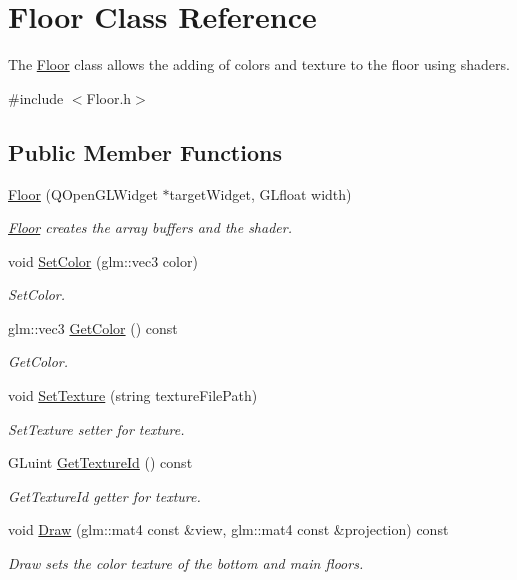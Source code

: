 \hypertarget{class_floor}{}\section{Floor Class Reference}
\label{class_floor}


The \hyperlink{class_floor}{Floor} class allows the adding of colors and texture to the floor using shaders.  




{\ttfamily \#include $<$Floor.\+h$>$}

\subsection*{Public Member Functions}
\begin{DoxyCompactItemize}
\item 
\hyperlink{class_floor_acd7d3bf0e838d5de06e973ac6310511b}{Floor} (Q\+Open\+G\+L\+Widget $\ast$target\+Widget, G\+Lfloat width)
\begin{DoxyCompactList}\small\item\em \hyperlink{class_floor}{Floor} creates the array buffers and the shader. \end{DoxyCompactList}\item 
void \hyperlink{class_floor_a6d0e6150ba611e218d81af542c8e0196}{Set\+Color} (glm\+::vec3 color)
\begin{DoxyCompactList}\small\item\em Set\+Color. \end{DoxyCompactList}\item 
glm\+::vec3 \hyperlink{class_floor_ad6022b618376adbf7087d5ccd3ea053d}{Get\+Color} () const 
\begin{DoxyCompactList}\small\item\em Get\+Color. \end{DoxyCompactList}\item 
void \hyperlink{class_floor_a61a025433294398423351ecc560e467b}{Set\+Texture} (string texture\+File\+Path)
\begin{DoxyCompactList}\small\item\em Set\+Texture setter for texture. \end{DoxyCompactList}\item 
G\+Luint \hyperlink{class_floor_ad1329cec2ad3a43d9418c6d4b98fe285}{Get\+Texture\+Id} () const 
\begin{DoxyCompactList}\small\item\em Get\+Texture\+Id getter for texture. \end{DoxyCompactList}\item 
void \hyperlink{class_floor_ac511f90a6e822dda5c9e3f2d40c5638f}{Draw} (glm\+::mat4 const \&view, glm\+::mat4 const \&projection) const 
\begin{DoxyCompactList}\small\item\em Draw sets the color texture of the bottom and main floors. \end{DoxyCompactList}\end{DoxyCompactItemize}


